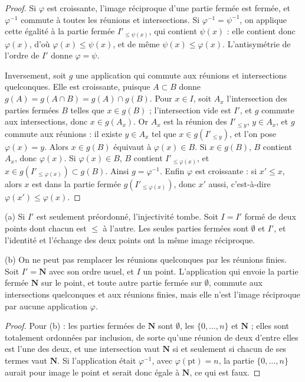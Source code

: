 \begin{proof}
Si $\varphi$ est croissante, l'image réciproque d'une partie fermée est fermée, et $\varphi^{-1}$ commute à toutes les réunions et intersections. Si $\varphi^{-1} = \psi^{-1}$, on applique cette égalité à la partie fermée $I'_{\leq \psi(x)}$, qui contient $\psi(x)$ : elle contient donc $\varphi(x)$, d'où $\varphi(x) \leq \psi(x)$, et de même $\psi(x) \leq \varphi(x)$. L'antisymétrie de l'ordre de $I'$ donne $\varphi = \psi$.

Inversement, soit $g$ une application qui commute aux réunions et intersections quelconques. Elle est croissante, puisque $A \subset B$ donne $g(A) = g(A \cap B) = g(A) \cap g(B)$. Pour $x \in I$, soit $A_x$ l'intersection des parties fermées $B$ telles que $x \in g(B)$ ; l'intersection vide est $I'$, et $g$ commute aux intersections, donc $x \in g(A_x)$. Or $A_x$ est la réunion des $I'_{\leq y}$, $y \in A_x$, et $g$ commute aux réunions : il existe $y \in A_x$ tel que $x \in g(I'_{\leq y})$, et l'on pose $\varphi(x) = y$. Alors $x \in g(B)$ équivaut à $\varphi(x) \in B$. Si $x \in g(B)$, $B$ contient $A_x$, donc $\varphi(x)$. Si $\varphi(x) \in B$, $B$ contient $I'_{\leq \varphi(x)}$, et $x \in g(I'_{\leq \varphi(x)}) \subset g(B)$. Ainsi $g = \varphi^{-1}$. Enfin $\varphi$ est croissante : si $x' \leq x$, alors $x$ est dans la partie fermée $g(I'_{\leq \varphi(x)})$, donc $x'$ aussi, c'est-à-dire $\varphi(x') \leq \varphi(x)$.
\end{proof}

\begin{encadre}
\begin{contrexemple}
\textup{(a)} Si $I'$ est seulement préordonné, l'injectivité tombe. Soit $I = I'$ formé de deux points dont chacun est $\leq$ à l'autre. Les seules parties fermées sont $\emptyset$ et $I'$, et l'identité et l'échange des deux points ont la même image réciproque.

\textup{(b)} On ne peut pas remplacer les réunions quelconques par les réunions finies. Soit $I'= \mathbf N$ avec son ordre usuel, et $I$ un point. L'application qui envoie la partie fermée $\mathbf N$ sur le point, et toute autre partie fermée sur $\emptyset$, commute aux intersections quelconques et aux réunions finies, mais elle n'est l'image réciproque par aucune application $\varphi$.
\end{contrexemple}
\end{encadre}

\begin{proof}
Pour (b) : les parties fermées de $\mathbf N$ sont $\emptyset$, les $\{0, \dots, n\}$ et $\mathbf N$ ; elles sont totalement ordonnées par inclusion, de sorte qu'une réunion de deux d'entre elles est l'une des deux, et une intersection vaut $\mathbf N$ si et seulement si chacun de ses termes vaut $\mathbf N$. Si l'application était $\varphi^{-1}$, avec $\varphi(\mathrm{pt}) = n$, la partie $\{0, \dots, n\}$ aurait pour image le point et serait donc égale à $\mathbf N$, ce qui est faux.
\end{proof}

